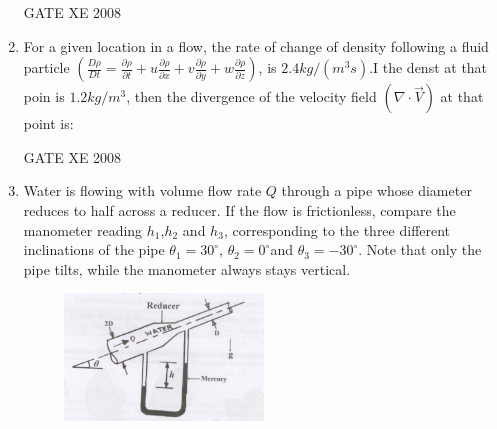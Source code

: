 \documentclass[12pt]{article}
\begin{document}
\begin{enumerate}[label=Q\arabic*.]
\begin{enumerate}[label=(\Alph*)]
\end{enumerate}

GATE XE 2008
\item For a given location in a flow, the rate of change of density following a fluid particle
$(\frac{D\rho}{Dt} = \frac{\partial \rho}{\partial t} + u\frac{\partial \rho}{\partial x} + v\frac{\partial \rho}{\partial y} + w\frac{\partial \rho}{\partial z})$, is $2.4 kg/(m^3 s)$.I the denst at that poin is $1.2 kg/m^3$, then
the divergence of the velocity field $(\nabla \cdot \vec{V})$ at that point is:

\begin{enumerate}[label=(\Alph*)]
\end{enumerate}

GATE XE 2008
\item Water is flowing with volume flow rate $Q$ through a pipe whose diameter reduces to half across a reducer. If the flow is frictionless, compare the manometer reading $h_1$,$h_2$ and $h_3$, corresponding to the three different inclinations of the pipe $\theta _1 = 30^{\circ}$, $\theta _2 = 0^{\circ}$and $\theta _3 =-30^{\circ}$. Note that only the pipe tilts, while the manometer always stays vertical.

\begin{figure}[H]
\centering
  \includegraphics[width=0.5\textwidth]{figs/ass1_d_q18.png}
  \caption{}
\end{figure} 


\end{enumerate}
\end{document}
